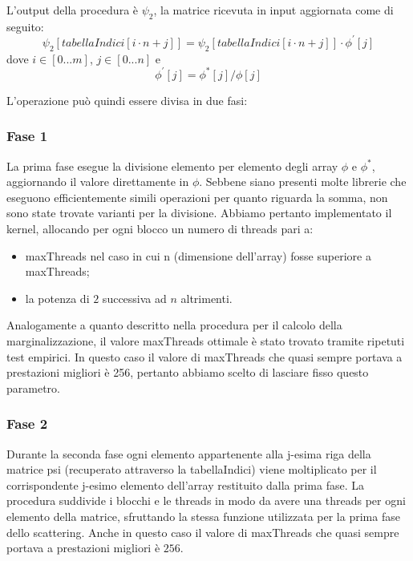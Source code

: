 \documentclass[a4paper]{article}   %
\begin{document}
L'output della procedura è $\psi_2$, la matrice ricevuta in input aggiornata come di seguito:
\begin{equation}
\psi_2[ tabellaIndici[ i \cdot n + j ] ] = \psi_2[ tabellaIndici[ i \cdot n + j ] ] \cdot  \phi^{'}[ j ]
\end{equation}
dove $i \in [0...m]$, $j \in [0...n]$ e
\begin{equation}
 \phi^{'}[ j ] = \phi^{*}[ j ] / \phi[ j ]
\end{equation}


L’operazione può quindi essere divisa in due fasi: 

\subsubsection{Fase 1}
La prima fase esegue la divisione elemento per elemento degli array $\phi$ e $\phi^{*}$, aggiornando il valore direttamente in $\phi$.
Sebbene siano presenti molte librerie che eseguono efficientemente simili operazioni per quanto riguarda la somma, non sono state trovate varianti per la divisione. 
Abbiamo pertanto implementato il kernel, allocando per ogni blocco un numero di threads pari a:
\begin{itemize}
\item maxThreads nel caso in cui n (dimensione dell’array) fosse superiore a maxThreads;
\item la potenza di $2$ successiva ad $n$ altrimenti. 
\end{itemize}
Analogamente a quanto descritto nella procedura per il calcolo della marginalizzazione, il valore maxThreads ottimale è stato trovato tramite ripetuti test empirici. In questo caso il valore di maxThreads che quasi sempre portava a prestazioni migliori è 256, pertanto abbiamo scelto di lasciare fisso questo parametro.

\subsubsection{Fase 2}
Durante la seconda fase ogni elemento appartenente alla j-esima riga della matrice psi (recuperato attraverso la tabellaIndici) viene moltiplicato per il corrispondente j-esimo elemento dell'array restituito dalla prima fase. 
La procedura suddivide i blocchi e le threads in modo da avere una threads per ogni elemento della matrice, sfruttando la stessa funzione utilizzata per la prima fase dello scattering.
Anche in questo caso il valore di maxThreads che quasi sempre portava a prestazioni migliori è $256$.
\end{document}
